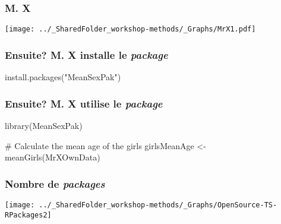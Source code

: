 \documentclass{beamer}
\begin{document}
    \begin{frame}
        \frametitle{M. X} \vspace{1cm}
        \begin{center}
            \texttt{[image: ../\_SharedFolder\_workshop-methods/\_Graphs/MrX1.pdf]}
        \end{center}
    \end{frame}

    \begin{frame}[fragile=singleslide]
        \frametitle{Ensuite? M. X installe le \emph{package}}
        \begin{code}
install.packages("MeanSexPak")
        \end{code}
    \end{frame}
    
    \begin{frame}[fragile=singleslide]
        \frametitle{Ensuite? M. X utilise le \emph{package}}
        \begin{code}
library(MeanSexPak)

# Calculate the mean age of the girls
girlsMeanAge <- meanGirls(MrXOwnData)
        \end{code}
    \end{frame}
    
    \begin{frame}
        \frametitle{Nombre de \emph{packages} \R}  \vspace{1.2cm}
        \begin{center}
            \texttt{[image: ../\_SharedFolder\_workshop-methods/\_Graphs/OpenSource-TS-RPackages2]}
        \end{center} 
    \end{frame}
   
   
   
\end{document}

